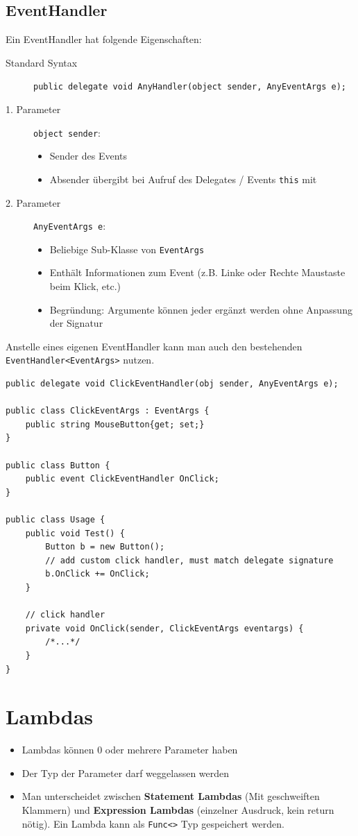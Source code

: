 \documentclass[
a4paper,
oneside,
10pt,
fleqn,
headsepline,
toc=listofnumbered, 
bibliography=totocnumbered]{scrartcl}
\let\stdsection\section
\renewcommand\section{\clearpage\stdsection}
\begin{document}
\subsection{EventHandler}
Ein EventHandler hat folgende Eigenschaften:
\begin{description}
	\item[Standard Syntax] \lstinline|public delegate void AnyHandler(object sender, AnyEventArgs e); |
	\item [1. Parameter] \lstinline|object sender|:
	      \begin{itemize}
		      \item Sender des Events
		      \item Absender übergibt bei Aufruf des Delegates / Events \lstinline|this| mit
	      \end{itemize}
	\item [2. Parameter] \lstinline|AnyEventArgs e|:
	      \begin{itemize}
		      \item Beliebige Sub-Klasse von \lstinline|EventArgs|
		      \item Enthält Informationen zum Event (z.B. Linke oder Rechte Maustaste beim Klick, etc.)
		      \item Begründung: Argumente können jeder ergänzt werden ohne Anpassung der Signatur
	      \end{itemize}
\end{description}

Anstelle eines eigenen EventHandler kann man auch den bestehenden \lstinline|EventHandler<EventArgs>| nutzen.
\begin{lstlisting}[caption=C\# Event Handler]
public delegate void ClickEventHandler(obj sender, AnyEventArgs e);

public class ClickEventArgs : EventArgs {
	public string MouseButton{get; set;}
}

public class Button {
	public event ClickEventHandler OnClick;
}

public class Usage {
	public void Test() {
		Button b = new Button();
		// add custom click handler, must match delegate signature
		b.OnClick += OnClick;
	}
	
	// click handler
	private void OnClick(sender, ClickEventArgs eventargs) {
		/*...*/
	}
}
\end{lstlisting}

\section{Lambdas}
\begin{itemize}
	\item Lambdas können 0 oder mehrere Parameter haben
	\item Der Typ der Parameter darf weggelassen werden
	\item Man unterscheidet zwischen \textbf{Statement Lambdas} (Mit geschweiften Klammern) und \textbf{Expression Lambdas} (einzelner Ausdruck, kein return nötig). Ein Lambda kann als \lstinline|Func<>| Typ gespeichert werden.
\end{itemize}
\end{document}
